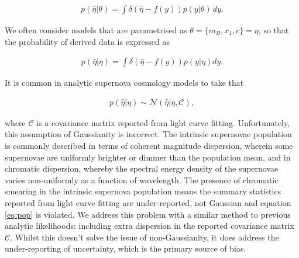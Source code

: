 \documentclass[a4paper,fleqn,usenatbib]{mnras}
\begin{document}
\begin{align}
p(\hat{\eta} | \theta) = \int \delta(\hat{\eta} - f(y)) p(y | \theta) \, dy.
\end{align}

We often consider models that are parametrised as $\theta = \lbrace m_B, x_1, c \rbrace = \eta$, so that the probability of derived data is expressed as

\begin{align}
p(\hat{\eta}|\eta) = \int \delta(\hat{\eta} - f(y)) p(y|\eta) dy. \label{eq:intsmear}
\end{align}

It is common in analytic supernova cosmology models to take that

\begin{align}
p(\hat{\eta}|\eta) \sim \mathcal{N}(\hat{\eta} | \eta, \mathcal{C}), \label{eq:pop}
\end{align}

where $\mathcal{C}$ is a covariance matrix reported from light curve fitting. Unfortunately, this assumption of Gaussianity is incorrect. The intrinsic supernovae population is commonly described in terms of coherent magnitude dispersion, wherein some supernovae are uniformly brighter or dimmer than the population mean, and in chromatic dispersion, whereby the spectral energy density of the supernovae varies non-uniformly as a function of wavelength. The presence of chromatic smearing in the intrinsic supernova population \citep{Guy2010, Chotard2011} means the summary statistics reported from light curve fitting are under-reported, not Gaussian and equation \eqref{eq:pop} is violated. We address this problem with a similar method to previous analytic likelihoods: including extra dispersion in the reported covariance matrix $\mathcal{C}$. Whilst this doesn't solve the issue of non-Gaussianity, it does address the under-reporting of uncertainty, which is the primary source of bias.
\end{document}
